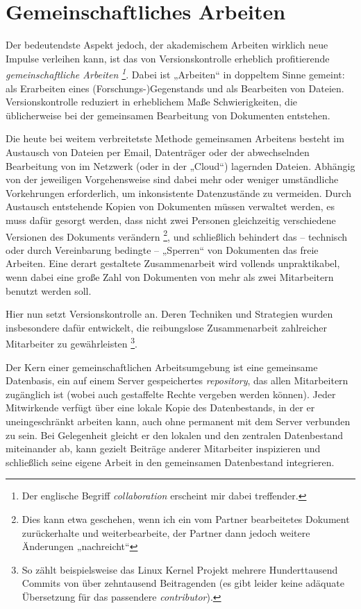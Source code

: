 \documentclass[DIV=12]{scrreprt}
\begin{document}
\section{Gemeinschaftliches Arbeiten}
\label{sec:pt_collaborative-editing}

Der bedeutendste Aspekt jedoch, der akademischem Arbeiten wirklich neue Impulse verleihen kann, ist das von Versionskontrolle erheblich profitierende \emph{gemeinschaftliche Arbeiten%
\footnote{Der englische Begriff \emph{collaboration} erscheint mir dabei treffender.}}.
Dabei ist „Arbeiten“ in doppeltem Sinne gemeint: als Erarbeiten eines (Forschungs-)Gegenstands und als Bearbeiten von Dateien.
Versionskontrolle reduziert in erheblichem Maße Schwierigkeiten, die üblicherweise bei der gemeinsamen Bearbeitung von Dokumenten entstehen.

Die heute bei weitem verbreitetste Methode gemeinsamen Arbeitens besteht im Austausch von Dateien per Email, Datenträger oder der abwechselnden Bearbeitung von im Netzwerk (oder in der „Cloud“) lagernden Dateien.
Abhängig von der jeweiligen Vorgehensweise sind dabei mehr oder weniger umständliche Vorkehrungen erforderlich, um inkonsistente Datenzustände zu vermeiden.
Durch Austausch entstehende Kopien von Dokumenten müssen verwaltet werden, es muss dafür gesorgt werden, dass nicht zwei Personen gleichzeitig verschiedene Versionen des Dokuments verändern%
\footnote{Dies kann etwa geschehen, wenn ich ein vom Partner bearbeitetes Dokument zurückerhalte und weiterbearbeite, der Partner dann jedoch weitere Änderungen „nachreicht“},
und schließlich behindert das -- technisch oder durch Vereinbarung bedingte -- „Sperren“ von Dokumenten das freie Arbeiten.
Eine derart gestaltete Zusammenarbeit wird vollends unpraktikabel, wenn dabei eine große Zahl von Dokumenten von mehr als zwei Mitarbeitern benutzt werden soll.

Hier nun setzt Versionskontrolle an.
Deren Techniken und Strategien wurden insbesondere dafür entwickelt, die reibungslose Zusammenarbeit zahlreicher Mitarbeiter zu gewährleisten%
\footnote{So zählt beispielsweise das Linux Kernel Projekt mehrere Hunderttausend Commits von über zehntausend Beitragenden (es gibt leider keine adäquate Übersetzung für das passendere \emph{contributor}).}.

Der Kern einer gemeinschaftlichen Arbeitsumgebung ist eine gemeinsame Datenbasis, ein auf einem Server gespeichertes \emph{repository}, das allen Mitarbeitern zugänglich ist (wobei auch gestaffelte Rechte vergeben werden können).
Jeder Mitwirkende verfügt über eine lokale Kopie des Datenbestands, in der er uneingeschränkt arbeiten kann, auch ohne permanent mit dem Server verbunden zu sein.
Bei Gelegenheit gleicht er den lokalen und den zentralen Datenbestand miteinander ab, kann gezielt Beiträge anderer Mitarbeiter inspizieren und schließlich seine eigene Arbeit in den gemeinsamen Datenbestand integrieren.
\end{document}

